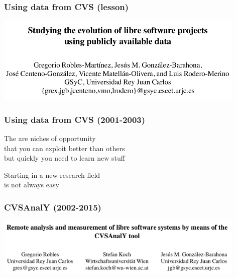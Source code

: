 \documentclass[17pt,aspectratio=169,hyperref=pdfusetitle]{beamer}
\begin{document}
\begin{frame}[fragile]
  \frametitle{Using data from CVS (lesson)}

  \begin{center}
  \includegraphics[width=12cm]{figs/evolution-data}
  \end{center}  
  
\end{frame}

\begin{frame}[fragile]
  \frametitle{Using data from CVS (2001-2003)}

  The are niches of opportunity \\
  that you can exploit better than others \\
  but quickly you need to learn new stuff \\
  
  \begin{center}
    Starting in a new research field \\
    is not always easy \\
  \end{center}  
  
\end{frame}


\begin{frame}[fragile]
  \frametitle{CVSAnalY (2002-2015)}

  \begin{center}
  \includegraphics[width=12cm]{figs/cvsanaly}
  \end{center}  
  
\end{frame}
\end{document}
